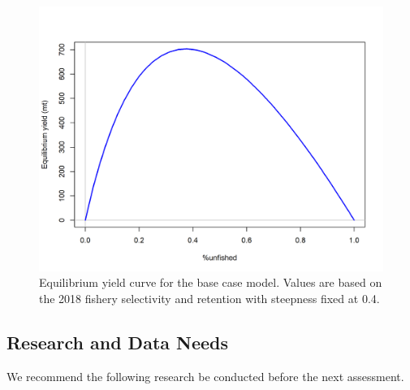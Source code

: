\documentclass[12pt,]{article}
\begin{document}
\begin{figure}
\centering
\includegraphics{r4ss/plots_mod1/yield1_yield_curve.png}
\caption{Equilibrium yield curve for the base case model. Values are
based on the 2018 fishery selectivity and retention with steepness fixed
at 0.4. \label{fig:Yield_all}}
\end{figure}

\FloatBarrier

\newpage

\hypertarget{research-and-data-needs}{%
\subsection*{Research and Data Needs}\label{research-and-data-needs}}

We recommend the following research be conducted before the next
assessment.
\end{document}
